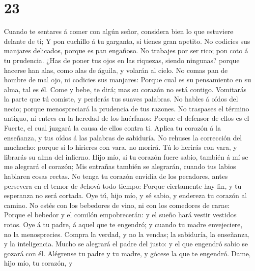 \hypertarget{section-22}{%
\section{23}\label{section-22}}

 Cuando te sentares á comer con algún señor, considera
bien lo que estuviere delante de ti;  Y pon cuchillo á tu
garganta, si tienes gran apetito.  No codicies sus
manjares delicados, porque es pan engañoso.  No trabajes
por ser rico; pon coto á tu prudencia.  ¿Has de poner tus
ojos en las riquezas, siendo ningunas? porque hacerse han alas, como
alas de águila, y volarán al cielo.  No comas pan de
hombre de mal ojo, ni codicies sus manjares:  Porque cual
es su pensamiento en su alma, tal es él. Come y bebe, te dirá; mas su
corazón no está contigo.  Vomitarás la parte que tú
comiste, y perderás tus suaves palabras.  No hables á
oídos del necio; porque menospreciará la prudencia de tus razones.
 No traspases el término antiguo, ni entres en la heredad
de los huérfanos:  Porque el defensor de ellos es el
Fuerte, el cual juzgará la causa de ellos contra ti. 
Aplica tu corazón á la enseñanza, y tus oídos á las palabras de
sabiduría.  No rehuses la corrección del muchacho: porque
si lo hirieres con vara, no morirá.  Tú lo herirás con
vara, y librarás su alma del infierno.  Hijo mío, si tu
corazón fuere sabio, también á mí se me alegrará el corazón;
 Mis entrañas también se alegrarán, cuando tus labios
hablaren cosas rectas.  No tenga tu corazón envidia de
los pecadores, antes persevera en el temor de Jehová todo tiempo:
 Porque ciertamente hay fin, y tu esperanza no será
cortada.  Oye tú, hijo mío, y sé sabio, y endereza tu
corazón al camino.  No estés con los bebedores de vino,
ni con los comedores de carne:  Porque el bebedor y el
comilón empobrecerán: y el sueño hará vestir vestidos rotos.
 Oye á tu padre, á aquel que te engendró; y cuando tu
madre envejeciere, no la menosprecies.  Compra la verdad,
y no la vendas; la sabiduría, la enseñanza, y la inteligencia.
 Mucho se alegrará el padre del justo: y el que engendró
sabio se gozará con él.  Alégrense tu padre y tu madre, y
gócese la que te engendró.  Dame, hijo mío, tu corazón, y
